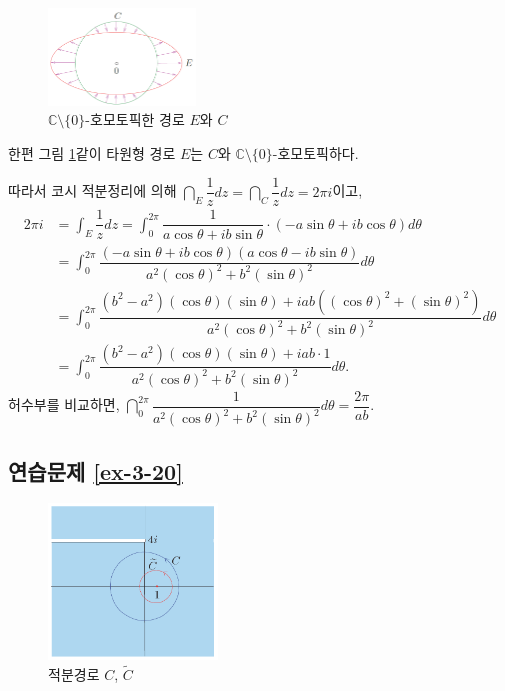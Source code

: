 \begin{figure}[h!]
\begin{center}
\includegraphics[width=0.35\textwidth]{./Solution/figs/fig-5-17}
\end{center}
\caption{$\mathbb C\setminus \{0\}$-호모토픽한 경로 $E$와 $C$}
\label{fig-5-17}
\end{figure}

한편 그림 \ref{fig-5-17}\과 같이 타원형 경로 $E$는 $C$와 
$\mathbb C\setminus \{0\}$-호모토픽하다.


따라서 코시 적분정리에 의해 $\dint_E \dfrac 1z dz = \dint_C \dfrac1z dz = 2\pi i$이고,
\begin{align*}
2\pi i &= \int_E \dfrac 1z dz = \int_0^{2\pi} \dfrac1{a\cos\theta +i b\sin\theta}
\cdot(-a\sin\theta + ib\cos\theta)d\theta \\
&= \int_0^{2\pi} \dfrac{(-a\sin\theta +ib\cos\theta)(a\cos\theta -ib\sin\theta)}
{a^2(\cos\theta)^2 + b^2(\sin\theta)^2}d\theta \\
&= \int_0^{2\pi} \dfrac{(b^2-a^2)(\cos\theta)(\sin\theta)+iab((\cos\theta)^2+(\sin\theta)^2)}
{a^2(\cos\theta)^2 + b^2(\sin\theta)^2}d\theta \\
&= \int_0^{2\pi} \dfrac{(b^2-a^2)(\cos\theta)(\sin\theta)+iab\cdot 1}
{a^2(\cos\theta)^2 + b^2(\sin\theta)^2}d\theta.
\end{align*}
허수부를 비교하면,
$\dint_0^{2\pi} \dfrac1{a^2(\cos\theta)^2 + b^2(\sin\theta)^2}d\theta = \dfrac{2\pi}{ab}$.

\subsection*{연습문제 \ref{ex-3-20}}

\begin{figure}[h!]
\begin{center}
\includegraphics[width=0.4\textwidth]{./Solution/figs/fig-5-18}
\end{center}
\caption{적분경로 $C$, $\tilde C$}
\label{fig-5-18}
\end{figure}

